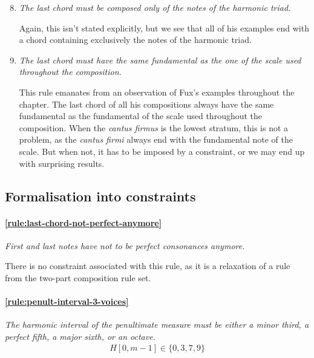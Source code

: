 \begin{enumerate}[wide, label=\bfseries G\arabic*]
    \setcounter{enumi}{7} %

    \item\label{rule:last-chord-h-triad} \textit{The last chord must be composed only of the notes of the harmonic triad.} 

    Again, this isn't stated explicitly, but we see that all of his examples end with a chord containing exclusively the notes of the harmonic triad.
    
    \item \textit{The last chord must have the same fundamental as the one of the scale used throughout the composition.}\label{rule:same-fundamental}

    This rule emanates from an observation of Fux's examples throughout the chapter. The last chord of all his compositions always have the same fundamental as the fundamental of the scale used throughout the composition.
    When the \textit{cantus firmus} is the lowest stratum, this is not a problem, as the \textit{cantus firmi} always end with the fundamental note of the scale. But when not, it has to be imposed by a constraint, or we may end up with surprising results.
\end{enumerate}

\subsection{Formalisation into constraints} \label{sec:generalconstraints}
    \paragraph{\hspace{0.6cm}\ref{rule:last-chord-not-perfect-anymore}} \greendots \textit{First and last notes have not to be perfect consonances anymore.}

    There is no constraint associated with this rule, as it is a relaxation of a rule from the two-part composition rule set.

    \paragraph{\hspace{0.6cm}\ref{rule:penult-interval-3-voices}} \greendots \textit{The harmonic interval of the penultimate measure must be either a minor third, a perfect fifth, a major sixth, or an octave.}
    \begin{equation}
        \begin{aligned}
            H[0, m-1] \in \{0, 3, 7, 9\}
        \end{aligned}
    \end{equation}

